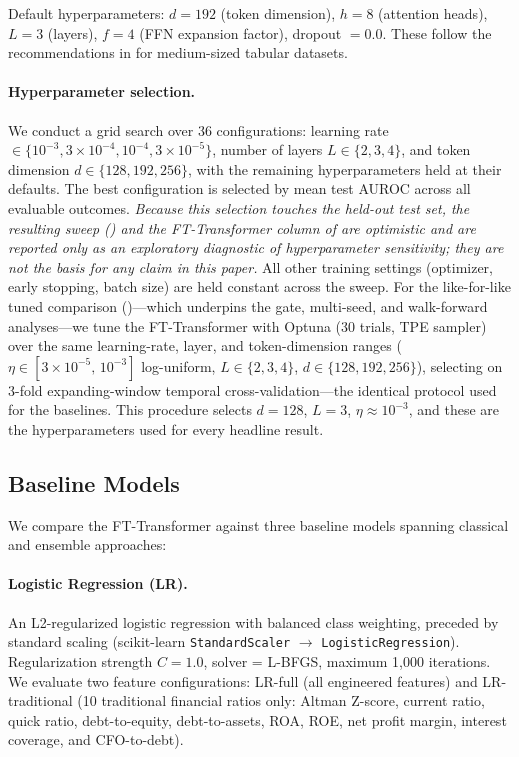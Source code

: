 Default hyperparameters: $d = 192$ (token dimension), $h = 8$ (attention heads), $L = 3$ (layers), $f = 4$ (FFN expansion factor), dropout $= 0.0$. These follow the recommendations in \citet{gorishniy2021revisiting} for medium-sized tabular datasets.

\paragraph{Hyperparameter selection.} We conduct a grid search over 36 configurations: learning rate $\in \{10^{-3}, 3{\times}10^{-4}, 10^{-4}, 3{\times}10^{-5}\}$, number of layers $L \in \{2, 3, 4\}$, and token dimension $d \in \{128, 192, 256\}$, with the remaining hyperparameters held at their defaults. The best configuration is selected by mean test AUROC across all evaluable outcomes. \emph{Because this selection touches the held-out test set, the resulting sweep () and the FT-Transformer column of  are optimistic and are reported only as an exploratory diagnostic of hyperparameter sensitivity; they are not the basis for any claim in this paper.} All other training settings (optimizer, early stopping, batch size) are held constant across the sweep. For the like-for-like tuned comparison ()---which underpins the gate, multi-seed, and walk-forward analyses---we tune the FT-Transformer with Optuna (30 trials, TPE sampler) over the same learning-rate, layer, and token-dimension ranges ($\eta \in [3{\times}10^{-5},\,10^{-3}]$ log-uniform, $L \in \{2,3,4\}$, $d \in \{128,192,256\}$), selecting on 3-fold expanding-window temporal cross-validation---the identical protocol used for the baselines. This procedure selects $d = 128$, $L = 3$, $\eta \approx 10^{-3}$, and these are the hyperparameters used for every headline result.

\subsection{Baseline Models}
\label{sec:baselines}

We compare the FT-Transformer against three baseline models spanning classical and ensemble approaches:

\paragraph{Logistic Regression (LR).} An L2-regularized logistic regression with balanced class weighting, preceded by standard scaling (scikit-learn \texttt{StandardScaler} $\rightarrow$ \texttt{LogisticRegression}). Regularization strength $C = 1.0$, solver = L-BFGS, maximum 1{,}000 iterations. We evaluate two feature configurations: LR-full (all engineered features) and LR-traditional (10 traditional financial ratios only: Altman Z-score, current ratio, quick ratio, debt-to-equity, debt-to-assets, ROA, ROE, net profit margin, interest coverage, and CFO-to-debt).

